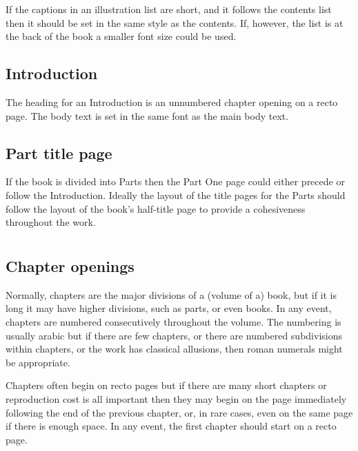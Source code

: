 \documentclass[10pt,letterpaper,extrafontsizes]{memoir}
\begin{document}
   If the captions in an illustration list 
are short, and it follows the
contents list then it should be set in the same style as the contents. 
If, however, the list is at the back of the book a smaller font size could 
be used.

\subsection{Introduction}

    The heading for an Introduction is an unnumbered
chapter opening on a recto page. The body text is set in the same font 
as the main body text. 

\subsection{Part title page}

    If the book is divided into Parts then the Part One 
page could either precede or follow the 
Introduction. Ideally the layout of the title pages for the Parts should
follow the layout of the book's half-title page 
to provide a cohesiveness throughout the work.

\section{\prMainmatter}

\subsection{Chapter openings}

    Normally, chapters are the major divisions of a (volume of a) book, 
but if it is long
it may have higher divisions, such as parts, or even books. In any event,
chapters are numbered consecutively throughout the volume. The numbering
is usually arabic but if there are few chapters, or there are numbered
subdivisions within chapters, or the work has classical allusions, then
roman numerals might be appropriate.

    Chapters often begin on recto pages but if there are many short chapters
or reproduction cost is all important then they may begin on the page
immediately following the end of the previous chapter, or, in rare cases,
even on the same page if there is enough space. In any event, the first chapter
should start on a recto page.
\end{document}
